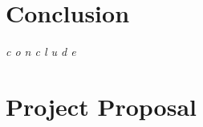 \documentclass[12pt,a4paper,twoside,openright]{report}
\begin{document}

\chapter{Conclusion}

\emph{c o n c l u d e}




\appendix

\chapter{Project Proposal}


\end{document}
